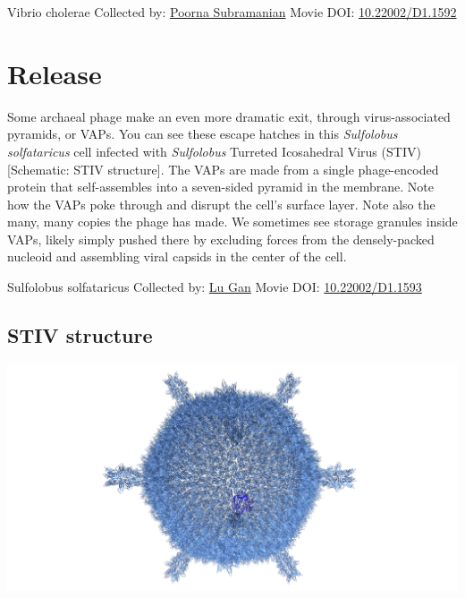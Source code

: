 \documentclass[]{tufte-book}
\begin{document}
\hypertarget{htmlwidget-9e5f161b79d4249a4a1a}{}

\label{fig:10-7}Vibrio cholerae Collected by: \protect\hyperlink{poorna_subramanian}{Poorna Subramanian} Movie DOI: \href{https://doi.org/10.22002/D1.1592}{10.22002/D1.1592}

\hypertarget{release}{%
\section{Release}\label{release}}

Some archaeal phage make an even more dramatic exit, through virus-associated pyramids, or VAPs. You can see these escape hatches in this \emph{Sulfolobus solfataricus} cell infected with \emph{Sulfolobus} Turreted Icosahedral Virus (STIV) {[}Schematic: STIV structure{]}. The VAPs are made from a single phage-encoded protein that self-assembles into a seven-sided pyramid in the membrane. Note how the VAPs poke through and disrupt the cell's surface layer. Note also the many, many copies the phage has made. We sometimes see storage granules inside VAPs, likely simply pushed there by excluding forces from the densely-packed nucleoid and assembling viral capsids in the center of the cell.



\hypertarget{htmlwidget-eb56b582f9c2ea53f6a2}{}

\label{fig:10-8}Sulfolobus solfataricus Collected by: \protect\hyperlink{lu_gan}{Lu Gan} Movie DOI: \href{https://doi.org/10.22002/D1.1593}{10.22002/D1.1593}

\hypertarget{STIV_structure}{%
\subsection{STIV structure}\label{STIV_structure}}

\includegraphics{img/schematics/10_8_1}
\end{document}
